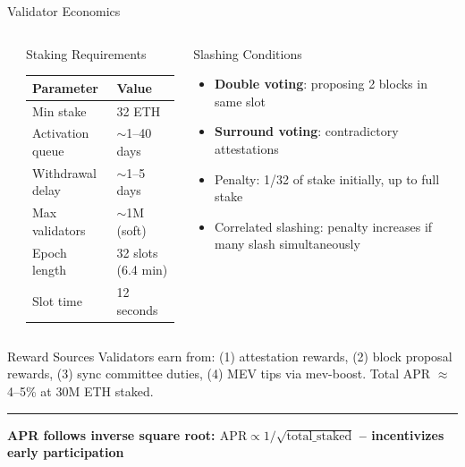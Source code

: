 \documentclass[8pt,aspectratio=169]{beamer}
\newcommand{\bottomnote}[1]{\vfill\vspace{-2mm}\textcolor{mllavender2}{\rule{\textwidth}{0.4pt}}\vspace{1mm}\footnotesize\textbf{#1}}
\begin{document}
\begin{frame}{Validator Economics}
\begin{columns}
\begin{center}
\end{center}
\begin{block}{Staking Requirements}
\small
\begin{tabular}{@{}ll@{}}
\toprule
\textbf{Parameter} & \textbf{Value} \\
\midrule
Min stake & 32 ETH \\
Activation queue & $\sim$1--40 days \\
Withdrawal delay & $\sim$1--5 days \\
Max validators & $\sim$1M (soft) \\
Epoch length & 32 slots (6.4 min) \\
Slot time & 12 seconds \\
\bottomrule
\end{tabular}
\end{block}
\vspace{2mm}
\begin{block}{Slashing Conditions}
\begin{itemize}\small
  \item \textbf{Double voting}: proposing 2 blocks in same slot
  \item \textbf{Surround voting}: contradictory attestations
  \item Penalty: 1/32 of stake initially, up to full stake
  \item Correlated slashing: penalty increases if many slash simultaneously
\end{itemize}
\end{block}
\end{columns}
\vspace{1mm}
\begin{alertblock}{Reward Sources}
\small Validators earn from: (1) attestation rewards, (2) block proposal rewards, (3) sync committee duties, (4) MEV tips via mev-boost. Total APR $\approx$ 4--5\% at 30M ETH staked.
\end{alertblock}
\bottomnote{APR follows inverse square root: $\text{APR} \propto 1/\sqrt{\text{total\_staked}}$ -- incentivizes early participation}
\end{frame}
\end{document}
